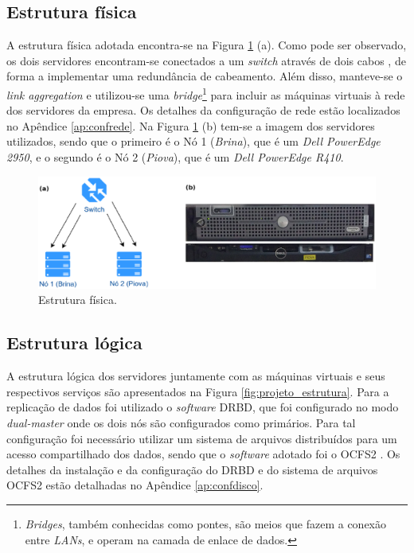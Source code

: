 \subsection{Estrutura física}

A estrutura física adotada encontra-se na Figura \ref{fig:projeto_fisico} (a). Como pode ser observado, os dois servidores encontram-se 
conectados a um \textit{switch} através de dois cabos , de forma a implementar uma redundância de cabeamento. Além disso, manteve-se o 
\textit{link aggregation} e utilizou-se uma \textit{bridge}\footnote[1]{\textit{Bridges}, também conhecidas como pontes, são meios que fazem a 
conexão entre \textit{LANs}, e operam na camada de enlace de dados.} para incluir as máquinas virtuais à rede dos servidores da empresa. 
Os detalhes da configuração de rede estão localizados no Apêndice \ref{ap:confrede}.
Na Figura \ref{fig:projeto_fisico} (b) tem-se a imagem dos servidores utilizados, sendo que o primeiro é o Nó 1 (\textit{Brina}), que é um 
\textit{Dell PowerEdge 2950}, e o segundo é o Nó 2 (\textit{Piova}), que é um \textit{Dell PowerEdge R410}.

\begin{figure}[h!]
 \centering
 \includegraphics[width=430px]{img/projeto_fisico.eps}
 \caption{Estrutura física.}
 \label{fig:projeto_fisico}
\end{figure}

\newpage
\subsection{Estrutura lógica}

A estrutura lógica dos servidores juntamente com as máquinas virtuais e seus respectivos serviços são apresentados na Figura 
\ref{fig:projeto_estrutura}. Para a replicação de dados foi utilizado o \textit{software} \ac{DRBD}, que foi configurado no modo 
\textit{dual-master} onde os dois nós são configurados como primários. Para tal configuração foi necessário utilizar um sistema de arquivos 
distribuídos para um acesso compartilhado dos dados, sendo que o \textit{software} adotado foi o \ac{OCFS2} \cite{ocfs2}. 
Os detalhes da instalação e da configuração do \ac{DRBD} e do sistema de arquivos \ac{OCFS2} estão detalhadas no Apêndice \ref{ap:confdisco}. 

